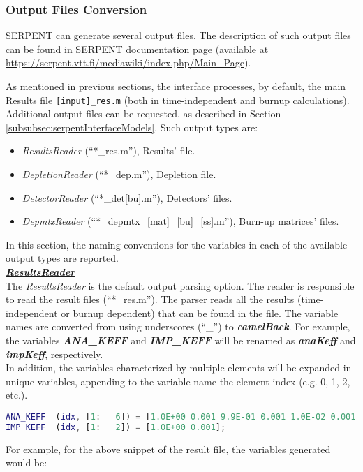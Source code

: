 \subsubsection{Output Files Conversion}
\label{subsubsec:serpentInterfaceOutputConversion}
SERPENT can generate several output files. The description of 
such output files can be found in SERPENT documentation page  
(available at \url{https://serpent.vtt.fi/mediawiki/index.php/Main_Page}).

As mentioned in previous sections, the interface processes, by default, the
main Results file \texttt{[input]\_res.m} (both in time-independent  and burnup calculations).
Additional output files can be requested, as described in Section 
\ref{subsubsec:serpentInterfaceModels}. Such output types are:
\begin{itemize}
   \item  \textit{ResultsReader} (``*\_res.m''), Results’ file.
   \item  \textit{DepletionReader} (``*\_dep.m''), Depletion file.
   \item \textit{DetectorReader}  (``*\_det[bu].m''), Detectors’ files.
   \item  \textit{DepmtxReader} (``*\_depmtx\_[mat]\_[bu]\_[ss].m''), Burn-up matrices’ files.
\end{itemize}

In this section, the naming conventions for the variables in each of the available output types 
are reported.\\

\textit{\textbf{\underline{ResultsReader}}}
\\The \textit{ResultsReader} is the default output parsing option. 
The reader is responsible to read the result files (``*\_res.m'').
The parser reads all the results (time-independent  or burnup dependent) that can
be found in the file.
The variable names are converted from using underscores (``\_'') to \textit{\textbf{camelBack}}. For example,
the variables \textit{\textbf{ANA\_KEFF}} and  \textit{\textbf{IMP\_KEFF}}  will be renamed
 as \textit{\textbf{anaKeff}} and \textit{\textbf{impKeff}}, respectively. 
 \\In addition, the variables characterized by multiple elements will be expanded in unique variables, 
 appending to the variable name the element index (e.g. 0, 1, 2, etc.). 
 \begin{lstlisting}[language={matlab}]
% _res.m file
ANA_KEFF  (idx, [1:   6]) = [1.0E+00 0.001 9.9E-01 0.001 1.0E-02 0.001];
IMP_KEFF  (idx, [1:   2]) = [1.0E+00 0.001];
\end{lstlisting}
For example, for the above snippet of the result file, the variables generated would be:

